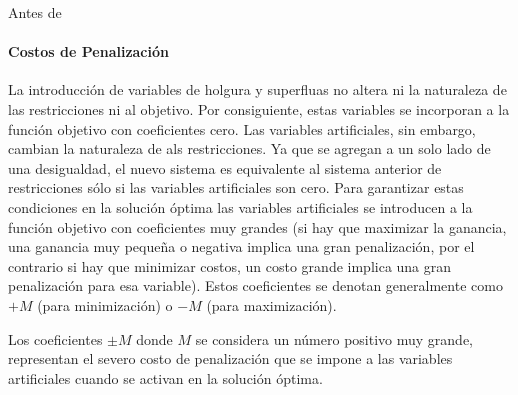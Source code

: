 Antes de 

\paragraph{Costos de Penalización}

La introducción de variables de holgura y superfluas no altera ni la naturaleza de las restricciones ni al objetivo. Por consiguiente, estas variables se incorporan a la función objetivo con coeficientes cero. Las variables artificiales, sin embargo, cambian la naturaleza de als restricciones. Ya que se agregan a un solo lado de una desigualdad, el nuevo sistema es equivalente al sistema anterior de restricciones sólo si las variables artificiales son cero. Para garantizar estas condiciones en la solución óptima las variables artificiales se introducen a la función objetivo con coeficientes muy grandes (si hay que maximizar la ganancia, una ganancia muy pequeña o negativa implica una gran penalización, por el contrario si hay que minimizar costos, un costo grande implica una gran penalización para esa variable). Estos coeficientes se denotan generalmente como \(+M\) (para minimización) o \(-M\) (para maximización).

Los coeficientes \(\pm M\) donde \(M\) se considera un número positivo muy grande, representan el severo costo de penalización que se impone a las variables artificiales cuando se activan en la solución óptima. 